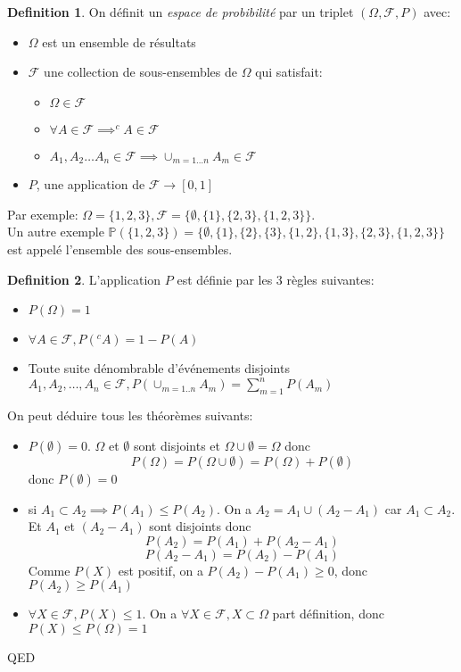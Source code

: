 \documentclass[]{book}
\theoremstyle{definition}
\newtheorem{defn}{Definition}
\newcommand{\bb}[1]{\mathbb{#1}}
\begin{document}
\begin{defn}
On d\'efinit un \emph{espace de probibilit\'e} par un triplet $(\Omega, \mathscr{F}, P)$ avec:
\begin{itemize}
\item $\Omega$ est un ensemble de r\'esultats
\item $\mathscr{F}$ une collection de sous-ensembles de $\Omega$ qui satisfait:
	\begin{itemize}
	\item $\Omega \in \mathscr{F}$
	\item $\forall A \in \mathscr{F} \implies ^{c}A \in \mathscr{F}$
	\item $A_1, A_2 \ldots A_n \in \mathscr{F} \implies \cup_{m = 1\ldots n}A_m \in \mathscr{F}$ 
	\end{itemize}
 \item $P$, une application de $\mathscr{F} \to [0,1]$
\end{itemize}
\end{defn}

Par exemple: $\Omega=\{1,2,3\}, \mathscr{F} = \{\emptyset, \{1\}, \{2,3\}, \{1,2,3\} \}$. \\

Un autre exemple $\bb{P}(\{1,2,3\}) = \{\emptyset, \{1\},  \{2\}, \{3\}, \{1,2\}, \{1,3\}, \{2,3\}, \{1,2,3\}\}$ est appel\'e l'ensemble des sous-ensembles.

\begin{defn}
L'application $P$ est d\'efinie par les 3 r\`egles suivantes:
\begin{itemize}
\item $P(\Omega) = 1$
\item $\forall A \in \mathscr{F}, P( {}^{c}A) = 1 - P(A)$
\item Toute suite d\'enombrable d'\'ev\'enements disjoints $A_1, A_2, \ldots, A_n \in \mathscr{F}, P(\cup_{m=1..n}A_m) = \sum_{m=1}^{n} P(A_m) $
\end{itemize}
\end{defn}


On peut d\'eduire tous les th\'eor\`emes suivants:
\begin{itemize}
\item $P(\emptyset) = 0$. $\Omega$ et $\emptyset$ sont disjoints et $\Omega \cup \emptyset = \Omega$ donc
$$P(\Omega) = P(\Omega \cup \emptyset) = P(\Omega) + P(\emptyset)$$ 
donc $P(\emptyset) = 0$
\item si $A_1 \subset A_2 \implies P(A_1) \leq P(A_2)$. On a $A_2 = A_1 \cup (A_2-A_1)$ car $A_1 \subset A_2$. Et $A_1$ et $(A_2 - A_1)$ sont disjoints donc
$$P(A_2) = P(A_1) + P(A_2-A_1)$$
$$P(A_2-A_1) = P(A_2) - P(A_1)$$
Comme $P(X)$ est positif, on a $P(A_2) - P(A_1) \geq 0$, donc $P(A_2) \geq P(A_1)$
\item $\forall X \in \mathscr{F}, P(X) \leq 1$. On a $\forall X \in \mathscr{F}, X \subset \Omega$ part d\'efinition, donc $P(X) \leq P(\Omega) = 1$
\end{itemize}



QED
\end{document}
